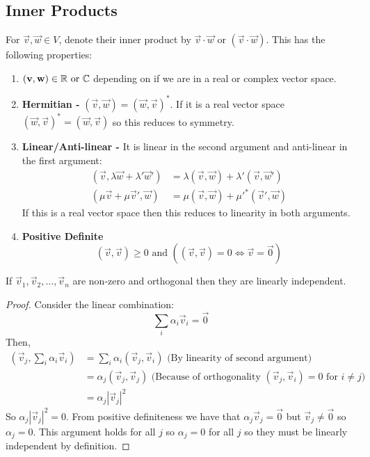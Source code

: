\documentclass[../main.tex]{subfiles}
\begin{document}
\subsection{Inner Products}
For $\vec{v}, \vec{w} \in V$, denote their inner product by $\vec{v} \cdot \vec{w}$ or $(\vec{v} \cdot \vec{w})$.
This has the following properties:
\begin{enumerate}
  \item $(\boldsymbol{\mathbf{v}}, \boldsymbol{\mathbf{w}}) \in \mathbb{R} \text{ or } \mathbb{C}$ depending on if we are in a real or complex vector space.
  \item \textbf{Hermitian -} $(\vec{v}, \vec{w}) = (\vec{w}, \vec{v})^{*}$.
    If it is a real vector space $(\vec{w}, \vec{v})^{*} = (\vec{w}, \vec{v})$ so this reduces to symmetry.
  \item \textbf{Linear/Anti-linear -} It is linear in the second argument and anti-linear in the first argument:
    \begin{align*}
      (\vec{v}, \lambda \vec{w} + \lambda' \vec{w}') &= \lambda(\vec{v}, \vec{w}) + \lambda' (\vec{v}, \vec{w}') \\
      (\mu \vec{v} + \mu \vec{v}', \vec{w}) &= \mu(\vec{v}, \vec{w}) + {\mu'}^{*}(\vec{v}', \vec{w})
    \end{align*}
    If this is a real vector space then this reduces to linearity in both arguments.
  \item \textbf{Positive Definite}
    \[
      (\vec{v}, \vec{v}) \geq 0 \text{ and } ((\vec{v}, \vec{v}) = 0 \iff \vec{v} = \vec{0})
    \]
\end{enumerate}
\begin{proposition}
  If $\vec{v}_1, \vec{v}_2, \ldots, \vec{v}_n$ are non-zero and orthogonal then they are linearly independent.
\end{proposition}
\begin{proof}
  Consider the linear combination:
  \[
    \sum_{i}^{} \alpha_i \vec{v}_i = \vec{0}
  \]
  Then,
  \begin{align*}
    \left(\vec{v}_j, \sum_{i}^{} \alpha_i \vec{v}_i\right) &= \sum_{i}^{} \alpha_i (\vec{v}_j, \vec{v}_i) \text{ (By linearity of second argument)}\\
                                                           &= \alpha_j (\vec{v}_j, \vec{v}_j) \text{ (Because of orthogonality $(\vec{v}_j, \vec{v}_i) = 0$ for $i \neq j$)}\\
                                                           &= \alpha_j |\vec{v}_j|^2
  \end{align*}
  So $\alpha_j|\vec{v}_j|^2 = 0$.
  From positive definiteness we have that $\alpha_j\vec{v}_j = \vec{0}$ but $\vec{v}_j \neq \vec{0}$ so $\alpha_j = 0$.
  This argument holds for all $j$ so $\alpha_j = 0$ for all $j$ so they must be linearly independent by definition.
\end{proof}
\end{document}
